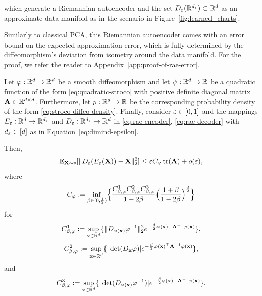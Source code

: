 which generate a Riemannian autoencoder and the set $D_\varepsilon(\mathbb{R}^{d_\varepsilon}) \subset \mathbb{R}^d$ as an approximate data manifold as in the scenario in Figure~\ref{fig:learned_charts}.

Similarly to classical PCA, this Riemannian autoencoder comes with an error bound on the expected approximation error, which is fully determined by the diffeomorphism’s deviation from isometry around the data manifold. For the proof, we refer the reader to Appendix~\ref{app:proof-of-rae-error}.
\begin{theorem}
\label{thm:rae-error}
    Let $\varphi:\mathbb{R}^d \to \mathbb{R}^d$ be a smooth diffeomorphism and let $\psi: \mathbb{R}^d \to \mathbb{R}$ be a quadratic function of the form \ref{eq:quadratic-stroco} with positive definite diagonal matrix $\mathbf{A} \in \mathbb{R}^{d\times d}$. Furthermore, let $p:\mathbb{R}^d \to\mathbb{R}$ be the corresponding probability density of the form \ref{eq:stroco-diffeo-density}. Finally, consider $\varepsilon\in [0,1]$ and the mappings $E_\varepsilon:\mathbb{R}^d \to \mathbb{R}^{d_\varepsilon}$ and $D_\varepsilon:\mathbb{R}^{d_\varepsilon} \to \mathbb{R}^d$ in \eqref{eq:rae-encoder}, \eqref{eq:rae-decoder} with $d_\varepsilon \in [d]$ as in Equation~\ref{eq:dimind-epsilon}.

    Then, 
    \begin{equation}
    \mathbb{E}_{\mathbf{X} \sim p}[\| D_\varepsilon(E_\varepsilon(\mathbf{X})) - \mathbf{X} \|_2^2]
    \leq \varepsilon C_\varphi \operatorname{tr}(\mathbf{A}) + o(\varepsilon),
    \label{eq:thm-rae-bound}
    \end{equation}
where 
\begin{equation}
    C_\varphi := \inf_{\beta\in [0,\frac{1}{2})}\Bigl\{  \frac{C^1_{\beta,\varphi} C^2_{\beta,\varphi} C^3_{\beta,\varphi}}{1 - 2\beta} \Bigl(\frac{1 + \beta}{1 - 2\beta} \Bigr)^{\frac{d}{2}} \Bigr\} 
\end{equation}
for
\begin{equation}
    C^1_{\beta,\varphi} := \sup_{\mathbf{x}\in \mathbb{R}^{d}} \{ \| D_{\varphi(\mathbf{x})} \varphi^{-1}\|_2^2 e^{-\frac{\beta}{2} \varphi(\mathbf{x})^\top \mathbf{A}^{-1} \varphi(\mathbf{x}) } \},
    \label{eq:RAEinvdiffeoRegConstantB}
\end{equation}
\begin{equation}
    C^2_{\beta,\varphi} := \sup_{\mathbf{x}\in \mathbb{R}^{d}} \{ |\det (D_{\mathbf{x}} \varphi)| e^{-\frac{\beta}{2} \varphi(\mathbf{x})^\top \mathbf{A}^{-1} \varphi(\mathbf{x}) } \},
\end{equation}
and
\begin{equation}
    C^3_{\beta,\varphi} := \sup_{\mathbf{x}\in \mathbb{R}^{d}} \{ |\det (D_{\varphi(\mathbf{x})} \varphi^{-1})| e^{-\frac{\beta}{2} \varphi(\mathbf{x})^\top \mathbf{A}^{-1} \varphi(\mathbf{x}) } \}.
\end{equation}
\end{theorem}

